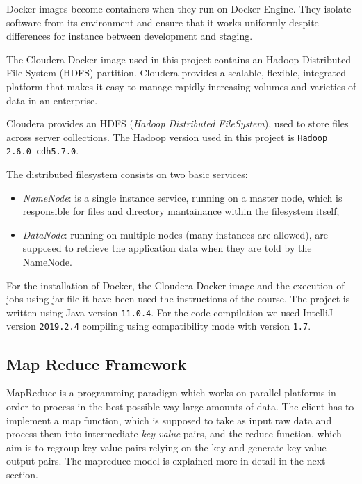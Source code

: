 \documentclass[a4paper,11pt, twoside]{article}
\begin{document}
		\bigskip

		\noindent
		Docker images become containers when they run on Docker Engine. They isolate software from its environment and ensure that it works uniformly despite differences for instance between development and staging.
		
		\bigskip

		\noindent
		The Cloudera\parencite{Cloudera} Docker image used in this project contains an Hadoop Distributed File System (HDFS) partition. Cloudera provides a scalable, flexible, integrated platform that makes it easy to manage rapidly increasing volumes and varieties of data in an enterprise. 

		\bigskip
		
		\noindent
		Cloudera provides an HDFS (\textit{Hadoop Distributed FileSystem})\parencite{Hadoop-Mapreduce}, used to store files across server collections. The Hadoop version used in this project is \texttt{Hadoop 2.6.0-cdh5.7.0}.
		
		The distributed filesystem consists on two basic services: \begin{itemize}
			\item \textit{NameNode}: is a single instance service, running on a master node, which is responsible for files and directory mantainance within the filesystem itself;
			
			\item \textit{DataNode}: running on multiple nodes (many instances are allowed), are supposed to retrieve the application data when they are told by the NameNode.
		\end{itemize}
	
		\bigskip
		
		\noindent
		For the installation of Docker, the Cloudera Docker image and the execution of jobs using jar file it have been used the instructions of the course. The project is written using Java version \texttt{11.0.4}. For the code compilation we used IntelliJ version \texttt{2019.2.4} compiling using compatibility mode with version \texttt{1.7}.

	\subsection{Map Reduce Framework}
		MapReduce is a programming paradigm which works on parallel platforms in order to process in the best possible way large amounts of data. The client has to implement a map function, which is supposed to take as input raw data and process them into intermediate \textit{key-value} pairs, and the reduce function, which aim is to regroup key-value pairs relying on the key and generate key-value output pairs. The mapreduce model is explained more in detail in the next section.
		
\end{document}

